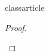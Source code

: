 \document class{article}
\usepackage{amsthm}
\usepackage{amstext}
\usepackage{amssymb}
\usepackage{scrextend}

\begin{proof}
  \begin{addmargin}{1em}
  \end{addmargin}
\end{proof}

